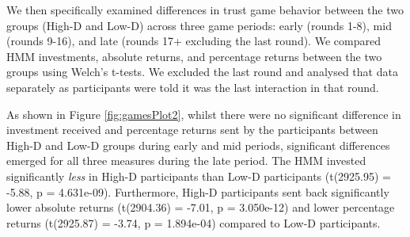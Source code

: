 \documentclass[
]{article}
\begin{document}
We then specifically examined differences in trust game behavior between the two groups (High-D and Low-D) across three game periods: early (rounds 1-8), mid (rounds 9-16), and late (rounds 17+ excluding the last round). We compared HMM investments, absolute returns, and percentage returns between the two groups using Welch's t-tests. We excluded the last round and analysed that data separately as participants were told it was the last interaction in that round.

As shown in Figure \ref{fig:gamesPlot2}, whilst there were no significant difference in investment received and percentage returns sent by the participants between High-D and Low-D groups during early and mid periods, significant differences emerged for all three measures during the late period. The HMM invested significantly \emph{less} in High-D participants than Low-D participants (t(2925.95) = -5.88, p = 4.631e-09). Furthermore, High-D participants sent back significantly lower absolute returns (t(2904.36) = -7.01, p = 3.050e-12) and lower percentage returns (t(2925.87) = -3.74, p = 1.894e-04) compared to Low-D participants.
\end{document}
